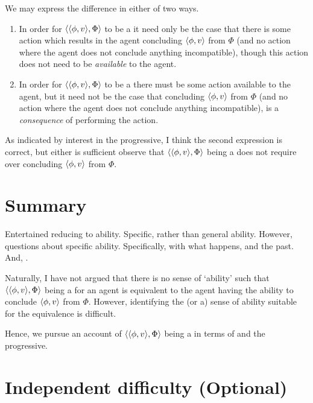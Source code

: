 \begin{note}
  We may express the difference in either of two ways.
  \begin{enumerate}[label=\arabic*.]
  \item
    In order for \(\langle \langle \phi, v \rangle, \Phi \rangle\) to be a \fc{} it need only be the case that there is some action which results in the agent concluding \(\langle \phi, v \rangle\) from \(\Phi\) (and no action where the agent does not conclude anything incompatible), though this action does not need to be \emph{available} to the agent.
  \item
    In order for \(\langle \langle \phi, v \rangle, \Phi \rangle\) to be a \fc{} there must be some action available to the agent, but it need not be the case that concluding \(\langle \phi, v \rangle\) from \(\Phi\) (and no action where the agent does not conclude anything incompatible), is a \emph{consequence} of performing the action.
  \end{enumerate}
  As indicated by interest in the progressive, I think the second expression is correct, but either is sufficient observe that \(\langle \langle \phi, v \rangle, \Phi \rangle\) being a \fc{} does not require \AbControl{} over concluding \(\langle \phi, v \rangle\) from \(\Phi\).
\end{note}

\section{Summary}

\begin{note}
  Entertained reducing  to ability.
  Specific, rather than general ability.
  However, questions about specific ability.
  Specifically, with what happens, and the past.
  And, \AbControl{}.
\end{note}

\begin{note}
  Naturally, I have not argued that there is no sense of `ability' such that \(\langle \langle \phi, v \rangle, \Phi \rangle\) being a  for an agent is equivalent to the agent having the ability to conclude \(\langle \phi, v \rangle\) from \(\Phi\).
  However, identifying the (or a) sense of ability suitable for the equivalence is difficult.

  Hence, we pursue an account of \(\langle \langle \phi, v \rangle, \Phi \rangle\) being a  in terms of  and the progressive.
\end{note}

\section[Independent difficulty]{Independent difficulty \hfill (Optional)}

